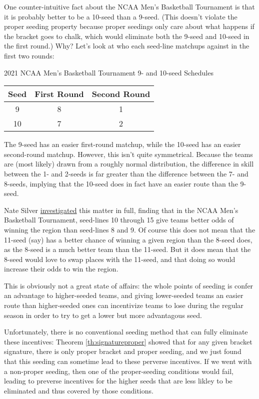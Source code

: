 \documentclass[../main.tex]{subfiles}
\begin{document}
One counter-intuitive fact about the NCAA Men's Basketball Tournament is that it is probably better to be a 10-seed than a 9-seed. (This doesn't violate the proper seeding property because proper seedings only care about what happens if the bracket goes to chalk, which would eliminate both the 9-seed and 10-seed in the first round.) Why? Let's look at who each seed-line matchups against in the first two rounds:

\begin{figg}{2021 NCAA Men's Basketball Tournament 9- and 10-seed Schedules}{}
    \centering
    \begin{tabular}{ c | c c }
         Seed & First Round & Second Round \\
         \hline
         9 & 8 & 1\\
        10 & 7 & 2
    \end{tabular}
\end{figg}

The 9-seed has an easier first-round matchup, while the 10-seed has an easier second-round matchup. However, this isn't quite symmetrical. Because the teams are (most likely) drawn from a roughly normal distribution, the difference in skill between the 1- and 2-seeds is far greater than the difference between the 7- and 8-seeds, implying that the 10-seed does in fact have an easier route than the 9-seed.

Nate Silver \href{https://fivethirtyeight.com/features/when-15th-is-better-than-8th-the-math-shows-the-bracket-is-backward/}{investigated} this matter in full, finding that in the NCAA Men's Basketball Tournament, seed-lines 10 through 15 give teams better odds of winning the region than seed-lines 8 and 9. Of course this does not mean that the 11-seed (say) has a better chance of winning a given region than the 8-seed does, as the 8-seed is a much better team than the 11-seed. But it does mean that the 8-seed would love to swap places with the 11-seed, and that doing so would increase their odds to win the region.

This is obviously not a great state of affairs: the whole points of seeding is confer an advantage to higher-seeded teams, and giving lower-seeded teams an easier route than higher-seeded ones can incentivize teams to lose during the regular season in order to try to get a lower but more advantagous seed.

Unfortunately, there is no conventional seeding method that can fully eliminate these incentives: Theorem \ref{th:signatureproper} showed that for any given bracket signature, there is only proper bracket and proper seeding, and we just found that this seeding can sometime lead to these perverse incentives. If we went with a non-proper seeding, then one of the proper-seeding conditions would fail, leading to preverse incentives for the higher seeds that are less likley to be eliminated and thus covered by those conditions.
\end{document}
